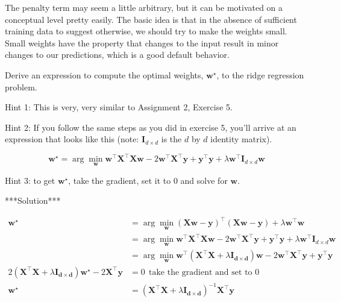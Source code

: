 \documentclass[assignment03_Solutions]{subfiles}
\begin{document}
The penalty term may seem a little arbitrary, but it can be motivated on a conceptual level pretty easily.  The basic idea is that in the absence of sufficient training data to suggest otherwise, we should try to make the weights small.  Small weights have the property that changes to the input result in minor changes to our predictions, which is a good default behavior.

\vspace{1em}
\begin{exercise}[(60 minutes)]
Derive an expression to compute the optimal weights, $\mathbf{w^\star}$, to the ridge regression problem.

Hint 1: This is very, very similar to Assignment 2, Exercise 5. 

Hint 2: If you follow the same steps as you did in exercise 5, you'll arrive at an expression that looks like this (note: $\mathbf{I}_{d \times d}$ is the $d$ by $d$ identity matrix).

$$\mathbf{w^\star} = \arg\min_\mathbf{w} \mathbf{w}^\top \mathbf{X}^\top \mathbf{X} \mathbf{w} - 2\mathbf{w}^\top \mathbf{X}^\top \mathbf{y} + \mathbf{y}^\top \mathbf{y} + \lambda \mathbf{w}^\top  \mathbf{I}_{d \times d} \mathbf{w}$$

Hint 3: to get $\mathbf{w^\star}$, take the gradient, set it to 0 and solve for $\mathbf{w}$.

\begin{boxedsolution}
***Solution***

$$\begin{align}\mathbf{w^\star} &= \arg\min_\mathbf{w} \left ( \mathbf{X}\mathbf{w} - \mathbf{y} \right)^\top \left ( \mathbf{X}\mathbf{w} -  \mathbf{y} \right) + \lambda \mathbf{w}^\top \mathbf{w} \\
& = \arg\min_\mathbf{w} \mathbf{w}^\top \mathbf{X}^\top \mathbf{X} \mathbf{w} - 2\mathbf{w}^\top \mathbf{X}^\top \mathbf{y} + \mathbf{y}^\top \mathbf{y} + \lambda \mathbf{w}^\top  \mathbf{I}_{d \times d} \mathbf{w}\\
&= \arg\min_\mathbf{w} \mathbf{w}^\top \left ( \mathbf{X}^\top \mathbf{X} + \lambda \mathbf{I_{d \times d}} \right )\mathbf{w} - 2\mathbf{w}^\top \mathbf{X}^\top \mathbf{y} + \mathbf{y}^\top \mathbf{y} \\
2 \left (  \mathbf{X}^\top \mathbf{X} + \lambda \mathbf{I_{d \times d}} \right ) \mathbf{w^\star} - 2 \mathbf{X}^\top \mathbf{y} &=0 ~~\mbox{take the gradient and set to 0} \\
\mathbf{w}^\star &= \left ( \mathbf{X}^\top \mathbf{X} + \lambda \mathbf{I_{d \times d}} \right)^{-1} \mathbf{X}^\top \mathbf{y}
\end{align}$$

\end{boxedsolution}
\end{exercise}
\end{document}
